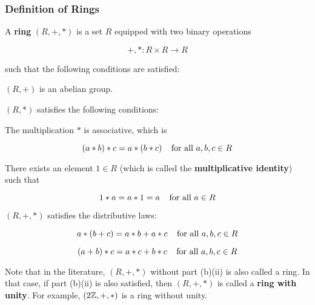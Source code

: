 \documentclass[a4paper,12pt]{article}
\begin{document}
\subsubsection{Definition of Rings}
\begin{dft}
  A \textbf{ring} $(R,+,*)$ is a set $R$ equipped with two binary operations

  $$+,*:R\times R\to R$$\s

  such that the following conditions are satisfied:

  \begin{alist}
    \item $(R,+)$ is an abelian group.
    \item $(R,*)$ satisfies the following conditions:

    \begin{rlist}
      \item The multiplication $*$ is associative, which is

      $$(a*b)*c=a*(b*c)\;\;\;\;\text{for all }a,b,c\in R$$

      \item There exists an element $1\in R$ (which is called the \textbf{multiplicative identity}) such that

      $$1*a=a*1=a\;\;\;\;\text{for all }a\in R$$
    \end{rlist}
    \item $(R,+,*)$ satisfies the distributive laws:

    \begin{rlist}
      \item

      $$a*(b+c)=a*b+a*c\;\;\;\;\text{for all }a,b,c\in R$$

      \item

      $$(a+b)*c=a*c+b*c\;\;\;\;\text{for all }a,b,c\in R$$
    \end{rlist}
  \end{alist}
\end{dft}\n

Note that in the literature, $(R,+,*)$ without part (b)(ii) is also called a ring. In that case, if part (b)(ii) is also satisfied, then $(R,+,*)$ is called a \textbf{ring with unity}. For example, $(2\mathbb{Z},+,*)$ is a ring without unity.\n
\end{document}
